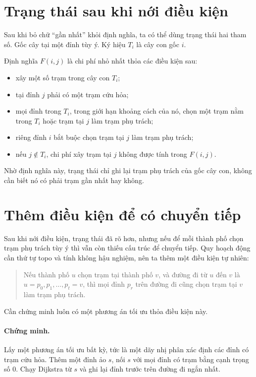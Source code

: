 \documentclass[11pt]{article}
\begin{document}
\section{Trạng thái sau khi nới điều kiện}

Sau khi bỏ chữ ``gần nhất'' khỏi định nghĩa, ta có thể dùng trạng thái hai
tham số. Gốc cây tại một đỉnh tùy ý. Ký hiệu \(T_i\) là cây con gốc \(i\).

Định nghĩa \(F(i,j)\) là chi phí nhỏ nhất thỏa các điều kiện sau:

\begin{itemize}
  \item xây một số trạm trong cây con \(T_i\);
  \item tại đỉnh \(j\) phải có một trạm cứu hỏa;
  \item mọi đỉnh trong \(T_i\), trong giới hạn khoảng cách của nó, chọn một
  trạm nằm trong \(T_i\) hoặc trạm tại \(j\) làm trạm phụ trách;
  \item riêng đỉnh \(i\) bắt buộc chọn trạm tại \(j\) làm trạm phụ trách;
  \item nếu \(j\notin T_i\), chi phí xây trạm tại \(j\) không được tính trong
  \(F(i,j)\).
\end{itemize}

Nhờ định nghĩa này, trạng thái chỉ ghi lại trạm phụ trách của gốc cây con,
không cần biết nó có phải trạm gần nhất hay không.

\section{Thêm điều kiện để có chuyển tiếp}

Sau khi nới điều kiện, trạng thái đã rõ hơn, nhưng nếu để mỗi thành phố chọn
trạm phụ trách tùy ý thì vẫn còn thiếu cấu trúc để chuyển tiếp. Quy hoạch động
cần thứ tự topo và tính không hậu nghiệm, nên ta thêm một điều kiện tự nhiên:

\begin{quote}
Nếu thành phố \(u\) chọn trạm tại thành phố \(v\), và đường đi từ \(u\) đến
\(v\) là \(u=p_0,p_1,\ldots,p_t=v\), thì mọi đỉnh \(p_r\) trên đường đi cũng
chọn trạm tại \(v\) làm trạm phụ trách.
\end{quote}

Cần chứng minh luôn có một phương án tối ưu thỏa điều kiện này.

\paragraph{Chứng minh.}
Lấy một phương án tối ưu bất kỳ, tức là một dãy nhị phân xác định các đỉnh có
trạm cứu hỏa. Thêm một đỉnh ảo \(s\), nối \(s\) với mọi đỉnh có trạm bằng cạnh
trọng số \(0\). Chạy Dijkstra từ \(s\) và ghi lại đỉnh trước trên đường đi
ngắn nhất.
\end{document}
